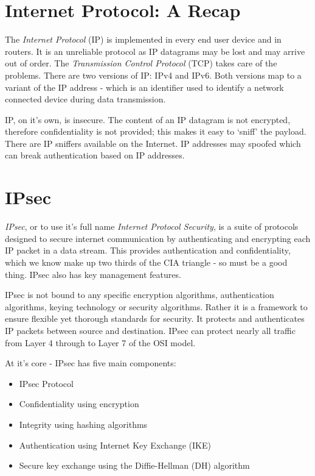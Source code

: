 
\section{Internet Protocol: A Recap}
The \textit{Internet Protocol} (IP) is implemented in every end user device and in routers. It is an unreliable protocol as IP datagrams may be lost and may arrive out of order. The \textit{Transmission Control Protocol} (TCP) takes care of the problems. There are two versions of IP: IPv4 and IPv6. Both versions map to a variant of the IP address - which is an identifier used to identify a network connected device during data transmission. 

IP, on it's own, is insecure. The content of an IP datagram is not encrypted, therefore confidentiality is not provided; this makes it easy to `sniff' the payload. There are IP sniffers available on the Internet. IP addresses may spoofed which can break authentication based on IP addresses. 

\section{IPsec}
\textit{IPsec}, or to use it's full name \textit{Internet Protocol Security}, is a suite of protocols designed to secure internet communication by authenticating and encrypting each IP packet in a data stream. This provides authentication and confidentiality, which we know make up two thirds of the CIA triangle - so must be a good thing. IPsec also has key management features.

IPsec is not bound to any specific encryption algorithms, authentication algorithms, keying technology or security algorithms. Rather it is a framework to ensure flexible yet thorough standards for security. It protects and authenticates IP packets between source and destination. IPsec can protect nearly all traffic from Layer 4 through to Layer 7 of the OSI model. 

At it's core - IPsec has five main components:
\begin{itemize}
    \item IPsec Protocol 
    \item Confidentiality using encryption
    \item Integrity using hashing algorithms
    \item Authentication using Internet Key Exchange (IKE)
    \item Secure key exchange using the Diffie-Hellman (DH) algorithm
\end{itemize}

